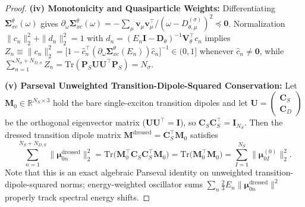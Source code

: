 \documentclass[10pt,a4paper]{article}
\newcommand{\Sig}{\mathbf{\Sigma}_{xc}^\theta}
\begin{document}
\begin{proof}
\textbf{(iv) Monotonicity and Quasiparticle Weights:} Differentiating $\Sig(\omega)$ gives $\partial_\omega \Sig(\omega) = -\sum_\mu \mathbf{v}_\mu \mathbf{v}_\mu^\top / (\omega - D_{\theta,\mu}^{(\sigma)})^2 \preceq \mathbf{0}$. Normalization $\|c_n\|_2^2 + \|d_n\|_2^2 = 1$ with $d_n = (E_n \mathbf{I} - \mathbf{D}_\theta)^{-1}\mathbf{V}_\theta^\top c_n$ implies $Z_n \equiv \|c_n\|_2^2 = \bigl[1 - \hat{c}_n^\top (\partial_\omega \Sig(E_n))\hat{c}_n\bigr]^{-1} \in (0,1]$ whenever $\hat{c}_n \neq \mathbf{0}$, while $\sum_{n=1}^{N_\sigma+N_{D,\sigma}} Z_n = \mathrm{Tr}(\mathbf{P}_S \mathbf{U}\mathbf{U}^\top \mathbf{P}_S) = N_\sigma$.

\textbf{(v) Parseval Unweighted Transition-Dipole-Squared Conservation:} Let $\mathbf{M}_0 \in \mathbb{R}^{N_S\times 3}$ hold the bare single-exciton transition dipoles and let $\mathbf{U} = \begin{pmatrix}\mathbf{C}_S \\ \mathbf{C}_D\end{pmatrix}$ be the orthogonal eigenvector matrix ($\mathbf{U}\mathbf{U}^\top = \mathbf{I}$), so $\mathbf{C}_S \mathbf{C}_S^\top = \mathbf{I}_{N_S}$. Then the dressed transition dipole matrix $\mathbf{M}^{\mathrm{dressed}} = \mathbf{C}_S^\top \mathbf{M}_0$ satisfies
\begin{equation}
\sum_{n=1}^{N_S + N_{D,S}} \|\boldsymbol{\mu}_{0n}^{\mathrm{dressed}}\|_2^2
= \mathrm{Tr}\!\bigl(\mathbf{M}_0^\top \mathbf{C}_S \mathbf{C}_S^\top \mathbf{M}_0\bigr)
= \mathrm{Tr}\!\bigl(\mathbf{M}_0^\top \mathbf{M}_0\bigr)
= \sum_{I=1}^{N_S} \|\boldsymbol{\mu}_{0I}^{(0)}\|_2^2.
\end{equation}
Note that this is an exact algebraic Parseval identity on unweighted transition-dipole-squared norms; energy-weighted oscillator sums $\sum_n \frac{2}{3} E_n \|\boldsymbol{\mu}_{0n}^{\mathrm{dressed}}\|^2$ properly track spectral energy shifts.
\end{proof}
\end{document}
